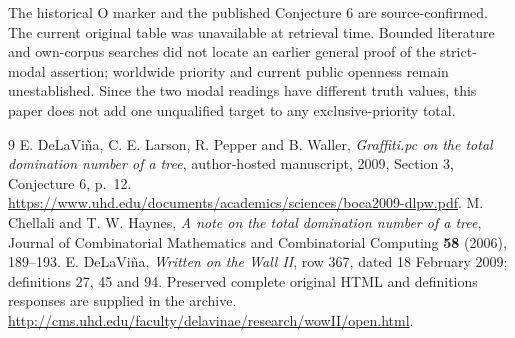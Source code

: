 \documentclass[11pt,a4paper]{article}
\begin{document}
The historical O marker and the published Conjecture 6 are source-confirmed. The current original table was unavailable at retrieval time. Bounded literature and own-corpus searches did not locate an earlier general proof of the strict-modal assertion; worldwide priority and current public openness remain unestablished. Since the two modal readings have different truth values, this paper does not add one unqualified target to any exclusive-priority total.

\begin{thebibliography}{9}
 E. DeLaVi\~na, C. E. Larson, R. Pepper and B. Waller,
\emph{Graffiti.pc on the total domination number of a tree}, author-hosted manuscript, 2009, Section 3, Conjecture 6, p.~12.
\url{https://www.uhd.edu/documents/academics/sciences/boca2009-dlpw.pdf}.
 M. Chellali and T. W. Haynes,
\emph{A note on the total domination number of a tree}, Journal of Combinatorial Mathematics and Combinatorial Computing \textbf{58} (2006), 189--193.
 E. DeLaVi\~na, \emph{Written on the Wall II}, row 367, dated 18 February 2009; definitions 27, 45 and 94. Preserved complete original HTML and definitions responses are supplied in the archive.
\url{http://cms.uhd.edu/faculty/delavinae/research/wowII/open.html}.
\end{thebibliography}
\end{document}
